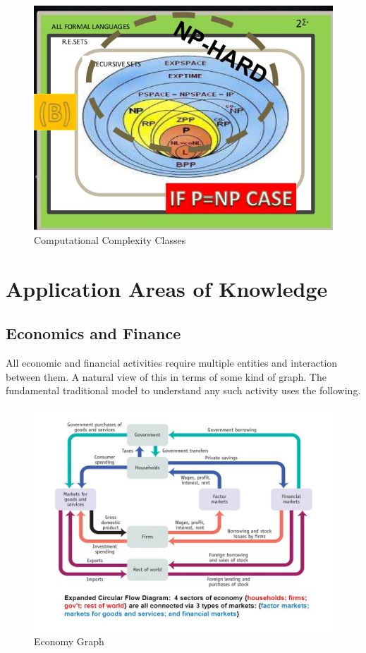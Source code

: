 \documentclass[11pt]{amsart}
\begin{document}
\begin{figure}[H]
\centering
  \includegraphics[scale=0.5]{complexity.jpg}
  \caption{Computational Complexity Classes}
  \label{fig:congress}
\end{figure}

\section{Application Areas of Knowledge}
\subsection{Economics and Finance}
All economic and financial activities require multiple entities and interaction between them. A natural view of this in terms of some kind of graph. The fundamental traditional model to understand any such activity uses the following. 
\begin{figure}[H]
\centering
  \includegraphics[scale=0.65]{economy.jpg}
  \caption{Economy Graph}
  \label{fig:congress}
\end{figure}
\end{document}
